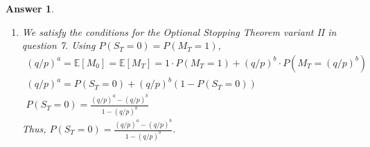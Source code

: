 \documentclass[12pt]{article}
\theoremstyle{colon}
\newtheorem*{answer}{Answer}
\begin{document}
\begin{answer}
\begin{enumerate}[label=\alph*)]
      Now for $N_n$.
      \begin{gather*}
        \mathbb{E}[ \lvert N_n \rvert ] = \mathbb{E}[ \lvert S_n - n(p-q) \rvert ] \\
        = \mathbb{E}[ \lvert a + X_1 + \mathellipsis + X_n - n(p-q) \rvert ] \\
        \leq \mathbb{E}[ \lvert a - n(p-q) \rvert ] + \mathbb{E}[ \lvert X_1 \rvert ] + \mathellipsis + \mathbb{E}[ \lvert X_n \rvert ]
      \end{gather*}
      Note that
      \begin{gather*}
        \mathbb{E}[ \lvert X_n \rvert ] = p + q = 1
      \end{gather*}
      So
      \begin{gather*}
        = \lvert a - n(p-q) \rvert + 1 + \mathellipsis + 1 \\
        = \lvert a - n(p-q) \rvert + n < \infty
      \end{gather*}
      So $N_n$ is integrable.

      $N_n$ is obviously $\mathcal{F}_n$ measurable since it is a function of $X_1, \mathellipsis, X_n$ which are $\mathcal{F}_n$ measurable by construction.

      Finally, by linearity
      \begin{gather*}
        \mathbb{E}[ N_t | \mathcal{F}_s ] = \mathbb{E}[a + X_1 + \mathellipsis + X_t - t(p-q) | \mathcal{F}_s] \\
        = \mathbb{E}[a + X_1 + \mathellipsis + X_s - s(p-q) | \mathcal{F}_s] \\
        + \mathbb{E}[X_{s+1} + \mathellipsis + X_t - (t-s)(p-q) | \mathcal{F}_s] \\
        = a + X_1 + \mathellipsis + X_s - s(p-q) + \mathbb{E}[X_{s+1} + \mathellipsis + X_t - (t-s)(p-q)] \\
        = N_s + \mathbb{E}[X_{s+1}] + \mathellipsis + \mathbb{E}[X_t] - (t-s)(p-q) \\
        = N_s + (p-q) + \mathellipsis + (p-q) - (t-s)(p-q) = N_s
      \end{gather*}
      Since $\mathbb{E}[X_t] = p - q$. Thus, $\mathbb{E}[ N_t | \mathcal{F}_s ] = N_s$ and so $N_n$ is a martingale.
    \item We satisfy the conditions for the Optional Stopping Theorem variant II in question 7. Using $P(S_T = 0) = P(M_T = 1)$,
      \begin{gather*}
        (q/p)^a = \mathbb{E}[M_0] = \mathbb{E}[M_T] = 1 \cdot P(M_T = 1) + (q/p)^b \cdot P(M_T = (q/p)^b) \\
        (q/p)^a = P(S_T = 0) + (q/p)^b (1-P(S_T = 0)) \\
        P(S_T = 0) = \frac{(q/p)^a - (q/p)^b}{1 - (q/p)^b}
      \end{gather*}
      Thus, $P(S_T = 0) = \frac{(q/p)^a - (q/p)^b}{1 - (q/p)^b}$.


\end{enumerate}
\end{answer}
\end{document}
